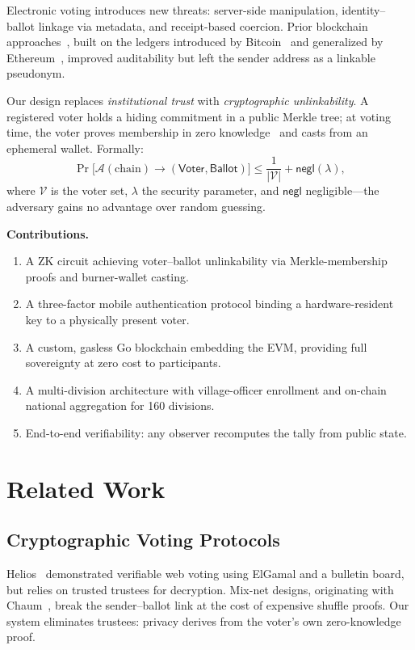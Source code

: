 \documentclass[conference]{IEEEtran}
\theoremstyle{definition}
\theoremstyle{plain}
\newcommand{\adv}{\mathcal{A}}
\newcommand{\negl}{\mathsf{negl}}
\begin{document}
Electronic voting introduces new threats: server-side manipulation, identity--ballot linkage via metadata, and receipt-based coercion. Prior blockchain approaches~\cite{mccorry2017,agora2017}, built on the ledgers introduced by Bitcoin~\cite{nakamoto2008} and generalized by Ethereum~\cite{ethereum2014}, improved auditability but left the sender address as a linkable pseudonym.

Our design replaces \emph{institutional trust} with \emph{cryptographic unlinkability}. A registered voter holds a hiding commitment in a public Merkle tree; at voting time, the voter proves membership in zero knowledge~\cite{gmr1989} and casts from an ephemeral wallet. Formally:
\begin{equation}
\Pr\!\bigl[\adv(\text{chain})\!\to\!(\mathsf{Voter},\mathsf{Ballot})\bigr] \le \frac{1}{|\mathcal{V}|} + \negl(\lambda),
\label{eq:anon}
\end{equation}
where $\mathcal{V}$ is the voter set, $\lambda$ the security parameter, and $\negl$ negligible---the adversary gains no advantage over random guessing.

\smallskip\noindent\textbf{Contributions.}
\begin{enumerate}[leftmargin=*,itemsep=2pt,topsep=3pt]
\item A ZK circuit achieving voter--ballot unlinkability via Merkle-membership proofs and burner-wallet casting.
\item A three-factor mobile authentication protocol binding a hardware-resident key to a physically present voter.
\item A custom, gasless Go blockchain embedding the EVM, providing full sovereignty at zero cost to participants.
\item A multi-division architecture with village-officer enrollment and on-chain national aggregation for 160 divisions.
\item End-to-end verifiability: any observer recomputes the tally from public state.
\end{enumerate}

\section{Related Work}

\subsection{Cryptographic Voting Protocols}
Helios~\cite{helios2008} demonstrated verifiable web voting using ElGamal and a bulletin board, but relies on trusted trustees for decryption. Mix-net designs, originating with Chaum~\cite{chaum1981}, break the sender--ballot link at the cost of expensive shuffle proofs. Our system eliminates trustees: privacy derives from the voter's own zero-knowledge proof.
\end{document}
